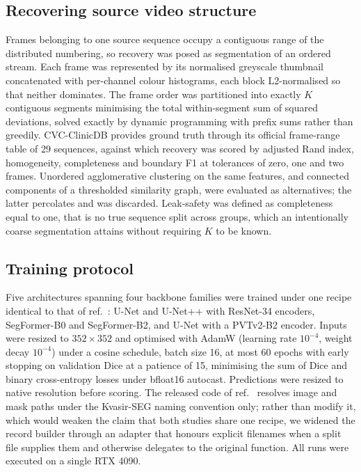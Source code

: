 \documentclass[11pt]{article}
\begin{document}
\subsection*{Recovering source video structure}
Frames belonging to one source sequence occupy a contiguous range of the
distributed numbering, so recovery was posed as segmentation of an ordered
stream. Each frame was represented by its normalised greyscale thumbnail
concatenated with per-channel colour histograms, each block L2-normalised so
that neither dominates. The frame order was partitioned into exactly $K$
contiguous segments minimising the total within-segment sum of squared
deviations, solved exactly by dynamic programming with prefix sums rather
than greedily. CVC-ClinicDB provides ground truth through its official
frame-range table of 29 sequences, against which recovery was scored by
adjusted Rand index, homogeneity, completeness and boundary F1 at tolerances
of zero, one and two frames. Unordered agglomerative clustering on the same
features, and connected components of a thresholded similarity graph, were
evaluated as alternatives; the latter percolates and was discarded.
Leak-safety was defined as completeness equal to one, that is no true
sequence split across groups, which an intentionally coarse segmentation
attains without requiring $K$ to be known.

\subsection*{Training protocol}
Five architectures spanning four backbone families were trained under one
recipe identical to that of ref.~\citep{puri2026what}: U-Net and U-Net++ with
ResNet-34 encoders, SegFormer-B0 and SegFormer-B2, and U-Net with a PVTv2-B2
encoder. Inputs were resized to $352 \times 352$ and optimised with AdamW
(learning rate $10^{-4}$, weight decay $10^{-4}$) under a cosine schedule,
batch size 16, at most 60 epochs with early stopping on validation Dice at a
patience of 15, minimising the sum of Dice and binary cross-entropy losses
under bfloat16 autocast. Predictions were resized to native resolution before
scoring. The released code of ref.~\citep{puri2026what} resolves image and
mask paths under the Kvasir-SEG naming convention only; rather than modify it,
which would weaken the claim that both studies share one recipe, we widened
the record builder through an adapter that honours explicit filenames when a
split file supplies them and otherwise delegates to the original function.
All \NRuns{} runs were executed on a single RTX 4090.
\end{document}
